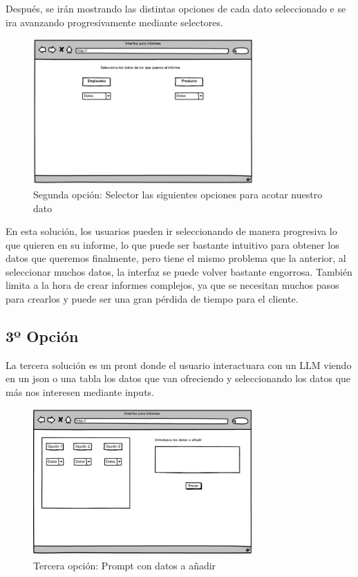 Después, se irán mostrando las distintas opciones de cada dato seleccionado e se ira avanzando progresivamente mediante selectores.

\begin{figure}[hp!]
    \centering
    \includegraphics[width=0.75\textwidth]{imaxes/iteracion1.4.png}
    \caption{Segunda opción: Selector las siguientes opciones para acotar nuestro dato}
    \label{fig:iteracion1.4}
\end{figure}

En esta solución, los usuarios pueden ir seleccionando de manera progresiva lo que quieren en su informe, lo que puede ser bastante 
intuitivo para obtener los datos que queremos finalmente, pero tiene el mismo problema que la anterior, al seleccionar muchos datos, 
la interfaz se puede volver bastante engorrosa. También limita a la hora de crear informes complejos, ya que se necesitan muchos pasos 
para crearlos y puede ser una gran pérdida de tiempo para el cliente.

\subsection{3º Opción}

La tercera solución es un pront donde el usuario interactuara con un LLM viendo en un json o una tabla los datos que van ofreciendo y 
seleccionando los datos que más nos interesen mediante inputs.

\begin{figure}[hp!]
    \centering
    \includegraphics[width=0.75\textwidth]{imaxes/iteracion1.5.png}
    \caption{Tercera opción: Prompt con datos a añadir}
    \label{fig:iteracion1.5}
\end{figure}

